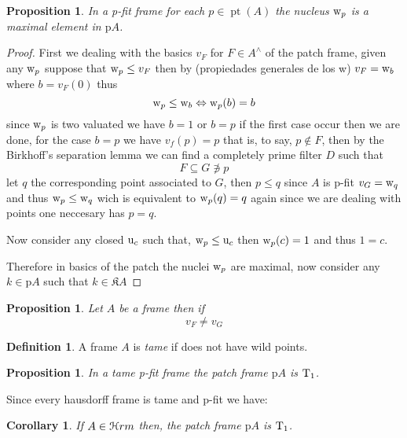 \documentclass[11pt]{amsart}
\DeclareMathOperator{\pt}{pt}
\newcommand{\niton}{\not\owns}
\theoremstyle{plain}
\newtheorem{cor}[thm]{Corollary}
\newtheorem{prop}[thm]{Proposition}
\theoremstyle{definition}
\newtheorem{dfn}[thm]{Definition}
\begin{document}
\begin{prop}\label{fitpro}
In a {\rm p-fit} frame for each $p\in\pt(A)$ the nucleus ${\rm w}_{p}$ is a maximal element in $\mathrm{p}A$.
\end{prop}



\begin{proof}\label{maxp}
First we dealing with the basics $v_{F}$ for $F\in A^{\wedge}$ of the patch frame, given any ${\rm w}_{p}$ suppose that  
${\rm w}_{p} \leq v_{F}$ then by (propiedades generales de los w) $v_{F}={\rm w}_{b}$ where $b=v_{F}(0)$ thus \[{\rm w}_{p}\leq {\rm w}_{b}\Leftrightarrow {\rm w}_{p}(b)=b\]
 since ${\rm w}_{p}$ is two valuated we have $b=1$ or $b=p$  if the first case occur then we are done, for the case $b=p$ we have $v_{f}(p)=p$ that is, to say, $p\notin F$,
 then by the Birkhoff's separation lemma we can find a completely prime filter $D$ such that \[F\subseteq G\niton p\] let $q$ the corresponding point associated to $G$, then $p\leq q$ since $A$ is 
 {\rm p-fit} $v_{G}={\rm w}_{q}$ and thus ${\rm w}_{p}\leq {\rm w}_{q}$ wich is equivalent to ${\rm w}_{p}(q)=q$ again since we are dealing with points one neccesary has $p=q$.

 Now consider any closed ${\rm u}_{c}$ such that, ${\rm w}_{p}\leq {\rm u}_{c}$ then ${\rm w}_{p}(c)=1$ and thus $1=c$.

 Therefore in basics of the patch the nuclei ${\rm w}_{p}$ are maximal, now consider any $k\in\mathrm{p}A$ such that $k\in\mathfrak{K}A$
\end{proof}


\begin{prop}\label{kcf}
Let $A$ be a frame then if \[v_{F}\neq v_{G}\]
\end{prop}




\begin{dfn}\label{tame}
A frame $A$ is \emph{tame} if does not have wild points.
\end{dfn}


\begin{prop}\label{fitpro1}
	In a tame {\rm p-fit} frame the patch frame  $\mathrm{p}A$ is ${\rm T}_{1}$.
	\end{prop}

Since every hausdorff frame is tame and {\rm p-fit} we have:

	\begin{cor}\label{fitpro2}
		If $A\in\EuScript{H}rm$ then, the patch frame  $\mathrm{p}A$ is ${\rm T}_{1}$.
	\end{cor}	
\end{document}
